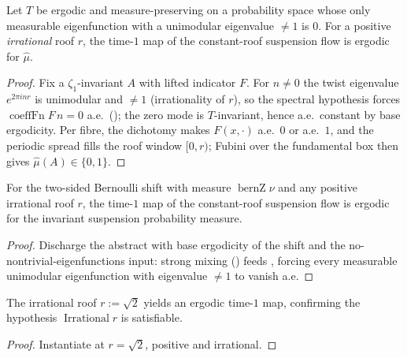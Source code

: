 \begin{theorem}\label{thm:susp-timeOneErgodic}
  \leanok
  Let $T$ be ergodic and measure-preserving on a probability space whose only measurable
  eigenfunction with a unimodular eigenvalue $\ne 1$ is $0$. For a positive \emph{irrational} roof
  $r$, the time-$1$ map of the constant-roof suspension flow is ergodic for $\hat\mu$.
\end{theorem}
\begin{proof}\leanok
  Fix a $\zeta_1$-invariant $A$ with lifted indicator $F$. For $n \ne 0$ the twist eigenvalue
  $e^{2\pi i n r}$ is unimodular and $\ne 1$ (irrationality of $r$), so the spectral hypothesis
  forces $\operatorname{coeffFn} F\,n = 0$ a.e.\ (); the zero mode is
  $T$-invariant, hence a.e.\ constant by base ergodicity. Per fibre, the dichotomy
   makes $F(x, \cdot)$ a.e.\ $0$ or a.e.\ $1$, and the periodic spread
  fills the roof window $[0, r)$; Fubini over the fundamental box then gives
  $\hat\mu(A) \in \{0, 1\}$.
\end{proof}

\begin{theorem}\label{thm:susp-bernTimeOne}
  \leanok
  For the two-sided Bernoulli shift with measure $\operatorname{bernZ}\nu$ and any positive
  irrational roof $r$, the time-$1$ map of the constant-roof suspension flow is ergodic for the
  invariant suspension probability measure.
\end{theorem}
\begin{proof}\leanok
  Discharge the abstract  with base ergodicity of the shift and the
  no-nontrivial-eigenfunctions input: strong mixing () feeds
  , forcing every measurable unimodular eigenfunction with eigenvalue $\ne 1$
  to vanish a.e.
\end{proof}

\begin{theorem}[Concrete non-vacuity witness $r = \sqrt2$]\label{thm:susp-sqrt2}
  \leanok
  The irrational roof $r := \sqrt2$ yields an ergodic time-$1$ map, confirming the hypothesis
  $\operatorname{Irrational} r$ is satisfiable.
\end{theorem}
\begin{proof}\leanok
  Instantiate  at $r = \sqrt2$, positive and irrational.
\end{proof}

